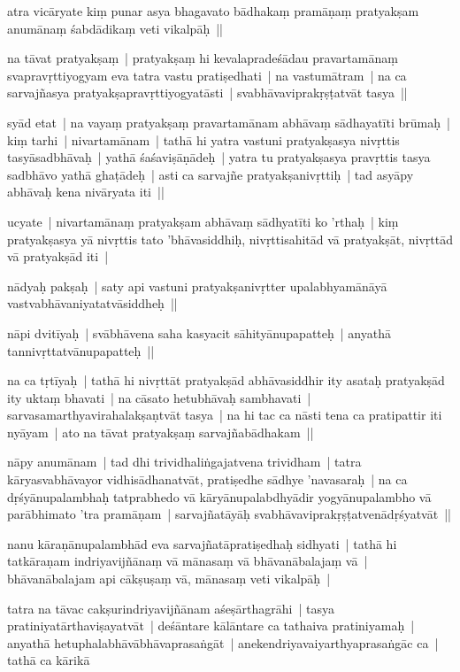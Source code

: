 \documentclass[article,a4paper]{memoir}
\begin{document}
	  \pstart atra vicā\-ryate kiṃ punar asya bhagavato bā\-dhakaṃ pramā\-ṇaṃ pratyakṣam anumā\-naṃ śabdā\-dikaṃ veti vikalpā\-ḥ || 
	\pend
      

	  \pstart na tā\-vat pratyakṣaṃ | pratyakṣaṃ hi kevalapradeśā\-dau pravartamā\-naṃ svapravṛttiyogyam eva tatra vastu pratiṣedhati | na vastumā\-tram | na ca sarvajñasya pratyakṣapravṛttiyogyatā\-sti | svabhā\-vaviprakṛṣṭatvā\-t tasya || 
	\pend
      

	  \pstart syā\-d etat | na vayaṃ pratyakṣaṃ pravartamā\-nam abhā\-vaṃ sā\-dhayatī\-ti brū\-maḥ | kiṃ tarhi | nivartamā\-nam | tathā\- hi yatra vastuni pratyakṣasya nivṛttis tasyā\-sadbhā\-vaḥ | yathā\- śaśaviṣā\-ṇā\-deḥ | yatra tu pratyakṣasya pravṛttis tasya sadbhā\-vo yathā\- ghaṭā\-deḥ | asti ca sarvajñe pratyakṣanivṛttiḥ | tad asyā\-py abhā\-vaḥ kena nivā\-ryata iti || 
	\pend
      

	  \pstart ucyate | nivartamā\-naṃ pratyakṣam abhā\-vaṃ sā\-dhyatī\-ti ko 'rthaḥ | kiṃ pratyakṣasya yā\- nivṛttis tato 'bhā\-vasiddhiḥ, nivṛttisahitā\-d vā\- pratyakṣā\-t, nivṛttā\-d vā\- pratyakṣā\-d iti | 
	\pend
      

	  \pstart nā\-dyaḥ pakṣaḥ | saty api vastuni pratyakṣanivṛtter upalabhyamā\-nā\-yā\- vastvabhā\-vaniyatatvā\-siddheḥ || 
	\pend
      

	  \pstart nā\-pi dvitī\-yaḥ | svā\-bhā\-vena saha kasyacit sā\-hityā\-nupapatteḥ | anyathā\- tannivṛttatvā\-nupapatteḥ || 
	\pend
      

	  \pstart na ca tṛtī\-yaḥ | tathā\- hi nivṛttā\-t pratyakṣā\-d abhā\-vasiddhir ity asataḥ pratyakṣā\-d ity uktaṃ bhavati | na cā\-sato hetubhā\-vaḥ sambhavati | sarvasamarthyavirahalakṣaṇtvā\-t tasya | na hi tac ca nā\-sti tena ca pratipattir iti nyā\-yam | ato na tā\-vat pratyakṣaṃ sarvajñabā\-dhakam || 
	\pend
      

	  \pstart nā\-py anumā\-nam | tad dhi trividhaliṅgajatvena trividham | tatra kā\-ryasvabhā\-vayor vidhisā\-dhanatvā\-t, pratiṣedhe sā\-dhye 'navasaraḥ | na ca dṛśyā\-nupalambhaḥ tatprabhedo vā\- kā\-ryā\-nupalabdhyā\-dir yogyā\-nupalambho vā\- parā\-bhimato 'tra pramā\-ṇam | sarvajñatā\-yā\-ḥ svabhā\-vaviprakṛṣṭatvenā\-dṛśyatvā\-t || 
	\pend
      

	  \pstart nanu kā\-raṇā\-nupalambhā\-d eva sarvajñatā\-pratiṣedhaḥ sidhyati | tathā\- hi tatkā\-raṇam indriyavijñā\-naṃ vā\- mā\-nasaṃ vā\- bhā\-vanā\-balajaṃ vā\- | bhā\-vanā\-balajam api cā\-kṣuṣaṃ vā\-, mā\-nasaṃ veti vikalpā\-ḥ | 
	\pend
      

	  \pstart tatra na tā\-vac cakṣurindriyavijñā\-nam aśeṣā\-rthagrā\-hi | tasya pratiniyatā\-rthaviṣayatvā\-t | deśā\-ntare kā\-lā\-ntare ca tathaiva pratiniyamaḥ | anyathā\- hetuphalabhā\-vā\-bhā\-vaprasaṅgā\-t | anekendriyavaiyarthyaprasaṅgā\-c ca | tathā\- ca kā\-rikā\- 
	\pend
      
\end{document}
